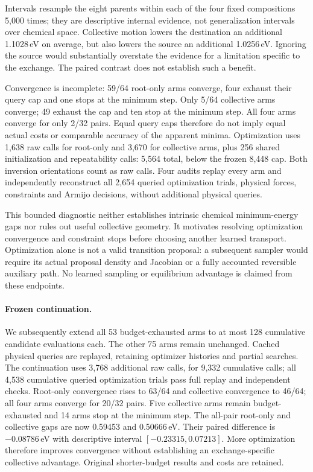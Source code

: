 Intervals resample the eight parents within each of the four fixed compositions
5,000 times; they are descriptive internal evidence, not generalization intervals
over chemical space. Collective motion lowers the destination an additional
1.1028\,eV on average, but also lowers the source an additional 1.0256\,eV.
Ignoring the source would substantially overstate the evidence for a limitation
specific to the exchange. The paired contrast does not establish such a benefit.

Convergence is incomplete: 59/64 root-only arms converge, four exhaust their
query cap and one stops at the minimum step. Only 5/64 collective arms converge;
49 exhaust the cap and ten stop at the minimum step. All four arms converge for
only 2/32 pairs. Equal query caps therefore do not imply equal actual costs or
comparable accuracy of the apparent minima. Optimization uses 1,638 raw calls
for root-only and 3,670 for collective arms, plus 256 shared initialization and
repeatability calls: 5,564 total, below the frozen 8,448 cap. Both inversion
orientations count as raw calls. Four audits replay every arm and independently
reconstruct all 2,654 queried optimization trials, physical forces, constraints
and Armijo decisions, without additional physical queries.

This bounded diagnostic neither establishes intrinsic chemical minimum-energy
gaps nor rules out useful collective geometry. It motivates resolving optimization
convergence and constraint stops before choosing another learned transport.
Optimization alone is not a valid transition proposal: a subsequent sampler
would require its actual proposal density and Jacobian or a fully accounted
reversible auxiliary path. No learned sampling or equilibrium advantage is
claimed from these endpoints.

\paragraph{Frozen continuation.}
We subsequently extend all 53 budget-exhausted arms to at most 128 cumulative
candidate evaluations each. The other 75 arms remain unchanged. Cached physical
queries are replayed, retaining optimizer histories and partial searches. The
continuation uses 3,768 additional raw calls, for 9,332 cumulative calls; all
4,538 cumulative queried optimization trials pass full replay and independent
checks. Root-only convergence rises to 63/64 and collective convergence to
46/64; all four arms converge for 20/32 pairs. Five collective arms remain
budget-exhausted and 14 arms stop at the minimum step. The all-pair root-only
and collective gaps are now 0.59453 and 0.50666\,eV. Their paired difference is
$-0.08786$\,eV with descriptive interval $[-0.23315,0.07213]$. More optimization
therefore improves convergence without establishing an exchange-specific
collective advantage. Original shorter-budget results and costs are retained.

